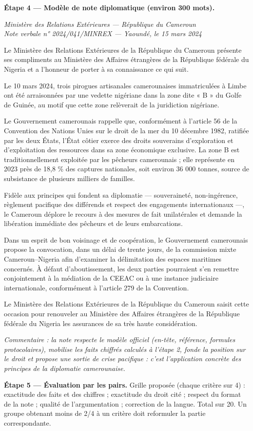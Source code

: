 \documentclass[11pt]{article}
\begin{document}
\begin{exoresolu}
\textbf{Étape 4 — Modèle de note diplomatique (environ 300 mots).}

\emph{Ministère des Relations Extérieures — République du Cameroun\\
Note verbale n° 2024/041/MINREX — Yaoundé, le 15 mars 2024}

Le Ministère des Relations Extérieures de la République du Cameroun présente ses compliments au Ministère des Affaires étrangères de la République fédérale du Nigeria et a l'honneur de porter à sa connaissance ce qui suit.

Le 10 mars 2024, trois pirogues artisanales camerounaises immatriculées à Limbe ont été arraisonnées par une vedette nigériane dans la zone dite « B » du Golfe de Guinée, au motif que cette zone relèverait de la juridiction nigériane.

Le Gouvernement camerounais rappelle que, conformément à l'article 56 de la Convention des Nations Unies sur le droit de la mer du 10 décembre 1982, ratifiée par les deux États, l'État côtier exerce des droits souverains d'exploration et d'exploitation des ressources dans sa zone économique exclusive. La zone B est traditionnellement exploitée par les pêcheurs camerounais ; elle représente en 2023 près de 18,8 \% des captures nationales, soit environ 36 000 tonnes, source de subsistance de plusieurs milliers de familles.

Fidèle aux principes qui fondent sa diplomatie — souveraineté, non-ingérence, règlement pacifique des différends et respect des engagements internationaux —, le Cameroun déplore le recours à des mesures de fait unilatérales et demande la libération immédiate des pêcheurs et de leurs embarcations.

Dans un esprit de bon voisinage et de coopération, le Gouvernement camerounais propose la convocation, dans un délai de trente jours, de la commission mixte Cameroun--Nigeria afin d'examiner la délimitation des espaces maritimes concernés. À défaut d'aboutissement, les deux parties pourraient s'en remettre conjointement à la médiation de la CEEAC ou à une instance judiciaire internationale, conformément à l'article 279 de la Convention.

Le Ministère des Relations Extérieures de la République du Cameroun saisit cette occasion pour renouveler au Ministère des Affaires étrangères de la République fédérale du Nigeria les assurances de sa très haute considération.

\emph{Commentaire : la note respecte le modèle officiel (en-tête, référence, formules protocolaires), mobilise les faits chiffrés calculés à l'étape 2, fonde la position sur le droit et propose une sortie de crise pacifique : c'est l'application concrète des principes de la diplomatie camerounaise.}

\textbf{Étape 5 — Évaluation par les pairs.} Grille proposée (chaque critère sur 4) : exactitude des faits et des chiffres ; exactitude du droit cité ; respect du format de la note ; qualité de l'argumentation ; correction de la langue. Total sur 20. Un groupe obtenant moins de 2/4 à un critère doit reformuler la partie correspondante.
\end{exoresolu}
\end{document}
